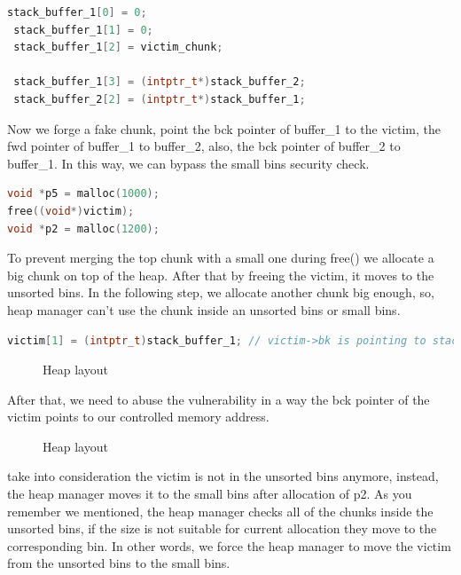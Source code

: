 \documentclass{masterthesis}
\newcommand*\ub{unsorted bins}
\newcommand*\sbs{small bins}
\begin{document}
\begin{lstlisting}[language=c,frame=tlrb]
 stack_buffer_1[0] = 0;
 stack_buffer_1[1] = 0;
 stack_buffer_1[2] = victim_chunk;

 stack_buffer_1[3] = (intptr_t*)stack_buffer_2;
 stack_buffer_2[2] = (intptr_t*)stack_buffer_1;
\end{lstlisting}
Now we forge a fake chunk, point the bck pointer of buffer\_1 to the victim, the fwd pointer of buffer\_1 to buffer\_2, also, the bck pointer of buffer\_2 to buffer\_1. In this way, we can bypass the \sbs{} security check. 
\begin{lstlisting}[language=c,frame=tlrb]
void *p5 = malloc(1000);
free((void*)victim);
void *p2 = malloc(1200);
\end{lstlisting}
 
To prevent merging the top chunk with a small one during free() we allocate a big chunk on top of the heap. After that by freeing the victim, it moves to the \ub{}. In the following step, we allocate another chunk big enough, so, heap manager can't use the chunk inside an \ub{} or \sbs{}.
\begin{lstlisting}[language=c,frame=tlrb]
victim[1] = (intptr_t)stack_buffer_1; // victim->bk is pointing to stack
\end{lstlisting}
  
\begin{figure}[h!]
  \caption{Heap layout}
\end{figure}
After that, we need to abuse the vulnerability in a way the bck pointer of the victim points to our controlled memory address. 
\begin{figure}[h!]
  \caption{Heap layout}
\end{figure}
take into consideration the victim is not in the \ub{} anymore, instead, the heap manager moves it to the \sbs{} after allocation of p2. As you remember we mentioned, the heap manager checks all of the chunks inside the \ub{}, if the size is not suitable for current allocation they move to the corresponding bin. In other words, we force the heap manager to move the victim from the \ub{} to the \sbs{}.
\end{document}
